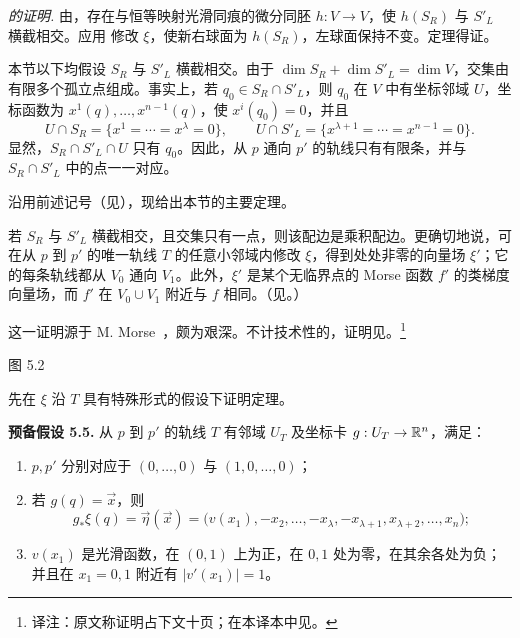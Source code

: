 \par\medskip\noindent\textit{ 的证明.}\quad
由，存在与恒等映射光滑同痕的微分同胚 $h:V\to V$，使 $h(S_R)$ 与 $S'_L$ 横截相交。应用 修改 $\xi$，使新右球面为 $h(S_R)$，左球面保持不变。定理得证。
\EndProof

本节以下均假设 $S_R$ 与 $S'_L$ 横截相交。由于
$\dim S_R+\dim S'_L=\dim V$，交集由有限多个孤立点组成。事实上，若 $q_0\in S_R\cap S'_L$，则 $q_0$ 在 $V$ 中有坐标邻域 $U$，坐标函数为
$x^1(q),\ldots,x^{n-1}(q)$，使 $x^i(q_0)=0$，并且
\[
  U\cap S_R=\{x^1=\cdots=x^\lambda=0\},
  \qquad
  U\cap S'_L=\{x^{\lambda+1}=\cdots=x^{n-1}=0\}.
\]
显然，$S_R\cap S'_L\cap U$ 只有 $q_0$。因此，从 $p$ 通向 $p'$ 的轨线只有有限条，并与 $S_R\cap S'_L$ 中的点一一对应。

沿用前述记号（见），现给出本节的主要定理。

若 $S_R$ 与 $S'_L$ 横截相交，且交集只有一点，则该配边是乘积配边。更确切地说，可在从 $p$ 到 $p'$ 的唯一轨线 $T$ 的任意小邻域内修改 $\xi$，得到处处非零的向量场 $\xi'$；它的每条轨线都从 $V_0$ 通向 $V_1$。此外，$\xi'$ 是某个无临界点的 Morse 函数 $f'$ 的类梯度向量场，而 $f'$ 在 $V_0\cup V_1$ 附近与 $f$ 相同。（见。）

\Remark 这一证明源于 M. Morse~\cite{ref11,ref32}，颇为艰深。不计技术性的，证明见。\footnote{译注：原文称证明占下文十页；在本译本中见。}

\begin{center}
  \FigFiveTwo

  \label{fig:5.2}图 5.2
\end{center}

先在 $\xi$ 沿 $T$ 具有特殊形式的假设下证明定理。

\par\medskip\noindent{}\label{assump:5.5}\label{proof:5-4-start}\textbf{预备假设 5.5.}\quad
从 $p$ 到 $p'$ 的轨线 $T$ 有邻域 $U_T$ 及坐标卡
$g:U_T\to\mathbb{R}^n$，满足：
\begin{enumerate}[label=\arabic*)]
  \item $p,p'$ 分别对应于 $(0,\ldots,0)$ 与 $(1,0,\ldots,0)$；
  \item 若 $g(q)=\vec x$，则
  \[
    g_*\xi(q)=\vec\eta(\vec x)
      =\bigl(v(x_1),-x_2,\ldots,-x_\lambda,
        -x_{\lambda+1},x_{\lambda+2},\ldots,x_n\bigr);
  \]
  \item $v(x_1)$ 是光滑函数，在 $(0,1)$ 上为正，在 $0,1$ 处为零，在其余各处为负；并且在 $x_1=0,1$ 附近有
  $|v'(x_1)|=1$。
\end{enumerate}

